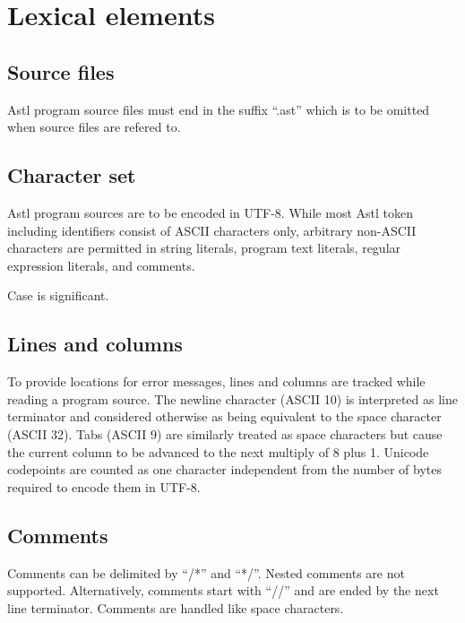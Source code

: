 \chapter{Lexical elements}

\section{Source files}

Astl program source files must end in the
suffix ``.ast'' which is to be omitted when
source files are refered to.

\section{Character set}

Astl program sources are to be encoded in UTF-8. While most Astl
token including identifiers consist of ASCII characters only,
arbitrary non-ASCII characters are permitted in string literals,
program text literals, regular expression literals, and comments.

Case is significant.

\section{Lines and columns}

To provide locations for error messages,
lines and columns are tracked while reading a
program source. The newline character
(ASCII 10) is interpreted as line terminator
and considered otherwise as being equivalent to the space
character (ASCII 32). Tabs (ASCII 9) are similarly treated as
space characters but cause the current column to be advanced to the next
multiply of 8 plus 1. Unicode codepoints are counted as one character
independent from the number of bytes required to encode them in UTF-8.

\section{Comments}

Comments can be delimited by ``/*'' and ``*/''. Nested comments
are not supported. Alternatively, comments start with ``//'' and
are ended by the next line terminator.
Comments are handled like space characters.

